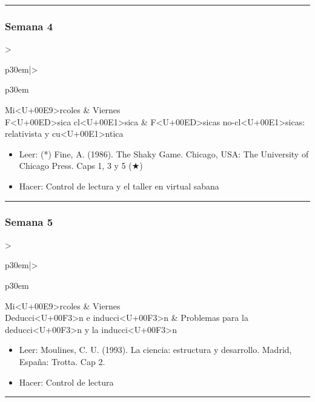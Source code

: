 \documentclass[spanish,]{article}
\begin{document}
\begin{center}\rule{0.5\linewidth}{\linethickness}\end{center}

\subsubsection{Semana 4}\label{semana-4}

\begin{tabular}{>{\raggedright\arraybackslash}p{30em}|>{\raggedright\arraybackslash}p{30em}}
\hline
Mi<U+00E9>rcoles & Viernes\\
\hline
F<U+00ED>sica cl<U+00E1>sica & F<U+00ED>sicas no-cl<U+00E1>sicas: relativista y cu<U+00E1>ntica\\
\hline
\end{tabular}

\begin{itemize}
\item
  Leer: (*) Fine, A. (1986). The Shaky Game. Chicago, USA: The
  University of Chicago Press. Caps 1, 3 y 5 (★)
\item
  Hacer: Control de lectura y el taller en virtual sabana
\end{itemize}

\begin{center}\rule{0.5\linewidth}{\linethickness}\end{center}

\subsubsection{Semana 5}\label{semana-5}

\begin{tabular}{>{\raggedright\arraybackslash}p{30em}|>{\raggedright\arraybackslash}p{30em}}
\hline
Mi<U+00E9>rcoles & Viernes\\
\hline
Deducci<U+00F3>n e inducci<U+00F3>n & Problemas para la deducci<U+00F3>n y la inducci<U+00F3>n\\
\hline
\end{tabular}

\begin{itemize}
\item
  Leer: Moulines, C. U. (1993). La ciencia: estructura y desarrollo.
  Madrid, España: Trotta. Cap 2.
\item
  Hacer: Control de lectura
\end{itemize}

\begin{center}\rule{0.5\linewidth}{\linethickness}\end{center}
\end{document}

